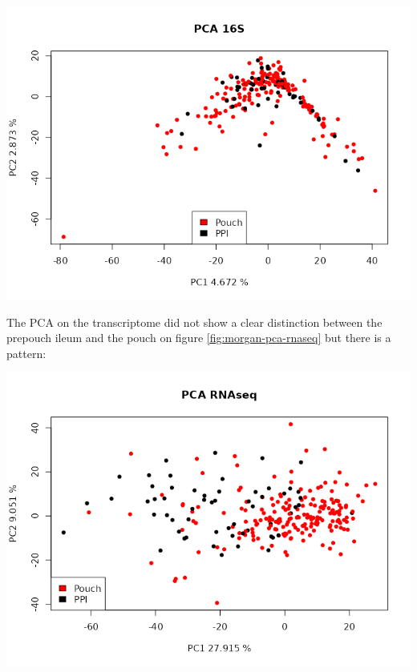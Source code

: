 \documentclass[
  12pt,
  a4paper,
  twoside,
  openright]{book}
\let\origfigure\figure
\let\endorigfigure\endfigure
\renewenvironment{figure}[1][2] {
    \expandafter\origfigure\expandafter[!htp]
} {
    \endorigfigure
}
\begin{document}
\begin{figure}
\includegraphics[width=1\linewidth]{images/morgan_pca_16S} \caption[PCA of 16S of the Morgan's dataset]{PCA of 16S of the Morgan's dataset. The sample are colored by location. }\label{fig:morgan-pca-16s}
\end{figure}

The PCA on the transcriptome did not show a clear distinction between the prepouch ileum and the pouch on figure \ref{fig:morgan-pca-rnaseq} but there is a pattern:

\begin{figure}
\includegraphics[width=1\linewidth]{images/morgan_pca_RNAseq} \caption[PCA of RNAseq of the Morgan's dataset]{PCA of RNAseq of the Morgan's dataset. The sample are colored by location. }\label{fig:morgan-pca-rnaseq}
\end{figure}
\end{document}
